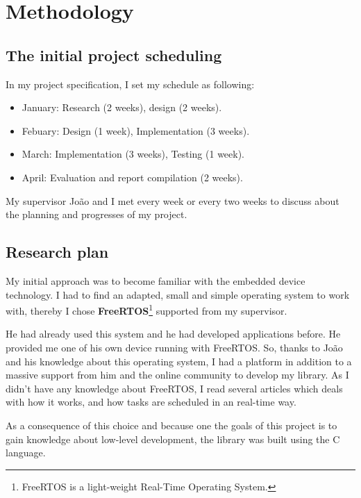 \chapter{Methodology}

\section{The initial project scheduling}

\hspace{15mm}In my project specification, I set my schedule as following:
\begin{itemize}
\item January: Research (2 weeks), design (2 weeks).
\item Febuary: Design (1 week), Implementation (3 weeks).
\item March: Implementation (3 weeks), Testing (1 week).
\item April: Evaluation and report compilation (2 weeks).
\end{itemize}

My supervisor Jo\~{a}o and I met every week or every two weeks to discuss about the planning and progresses of my project. 


\section{Research plan}

\hspace{15mm}My initial approach was to become familiar with the embedded device technology. I had to find an adapted, small and simple operating system to work with, thereby I chose \textbf{FreeRTOS}\footnote{FreeRTOS is a light-weight Real-Time Operating System.} supported from my supervisor.

He had already used this system and he had developed applications before. He provided me one of his own device running with FreeRTOS. So, thanks to Jo\~{a}o and his knowledge about this operating system, I had a platform in addition to a massive support from him and the online community to develop my library. As I didn't have any knowledge about FreeRTOS, I read several articles which deals with how it works, and how tasks are scheduled in an real-time way.

As a consequence of this choice and because one the goals of this project is to gain knowledge about low-level development, the library was built using the C language.

